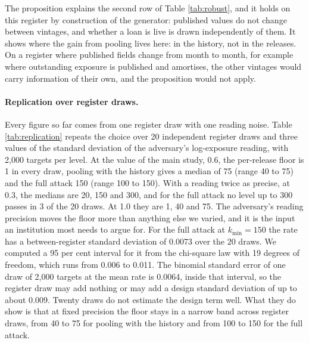 \documentclass[11pt,a4paper]{article}
\theoremstyle{plain}
\theoremstyle{definition}
\theoremstyle{definition}
\theoremstyle{plain}
\begin{document}
The proposition explains the second row of Table \ref{tab:robust}, and it holds on
this register by construction of the generator: published values do not change
between vintages, and whether a loan is live is drawn independently of them. It
shows where the gain from pooling lives here: in the history, not in the
releases. On a register where published fields change from month to month, for
example where outstanding exposure is published and amortises, the other vintages
would carry information of their own, and the proposition would not apply.

\paragraph{Replication over register draws.} Every figure so far comes from one
register draw with one reading noise. Table \ref{tab:replication} repeats the
choice over 20 independent register draws and three values of the standard
deviation of the adversary's log-exposure reading, with 2{,}000 targets per level.
At the value of the main study, 0.6, the per-release floor is 1 in every draw,
pooling with the history gives a median of 75 (range 40 to 75) and the full
attack 150 (range 100 to 150). With a reading twice as precise, at 0.3, the
medians are 20, 150 and 300, and for the full attack no level up to 300 passes in
3 of the 20 draws. At 1.0 they are 1, 40 and 75. The adversary's reading
precision moves the floor more than anything else we varied, and it is the input
an institution most needs to argue for. For the full attack at $k_{\min} = 150$
the rate has a between-register standard deviation of 0.0073 over the 20 draws.
We computed a 95 per cent interval for it from the chi-square law with 19 degrees
of freedom, which runs from 0.006 to 0.011. The binomial standard error of one
draw of 2{,}000 targets at the mean rate is 0.0064, inside that interval, so the
register draw may add nothing or may add a design standard deviation of up to
about 0.009. Twenty draws do not estimate the design term well. What they do show
is that at fixed precision the floor stays in a narrow band across register
draws, from 40 to 75 for pooling with the history and from 100 to 150 for the
full attack.

\begingroup\let\small\scriptsize\setlength{\tabcolsep}{4pt}\endgroup
\end{document}
